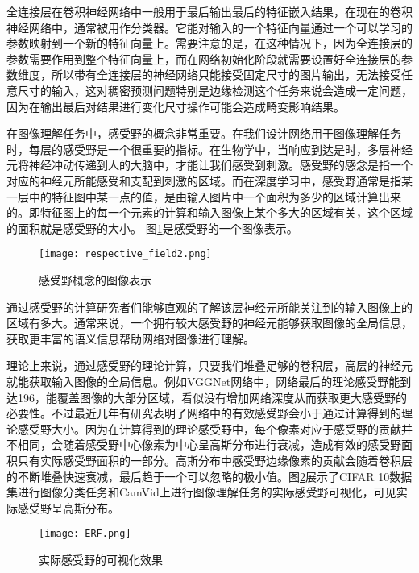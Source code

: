 \documentclass[master]{thesis-uestc}
\begin{document}
全连接层在卷积神经网络中一般用于最后输出最后的特征嵌入结果，在现在的卷积神经网络中，通常被用作分类器。它能对输入的一个特征向量通过一个可以学习的参数映射到一个新的特征向量上。需要注意的是，在这种情况下，因为全连接层的参数需要作用到整个特征向量上，而在网络初始化阶段就需要设置好全连接层的参数维度，所以带有全连接层的神经网络只能接受固定尺寸的图片输出，无法接受任意尺寸的输入，这对稠密预测问题特别是边缘检测这个任务来说会造成一定问题，因为在输出最后对结果进行变化尺寸操作可能会造成畸变影响结果。 

在图像理解任务中，感受野的概念非常重要。在我们设计网络用于图像理解任务时，每层的感受野是一个很重要的指标。在生物学中，当响应到达是时，多层神经元将神经冲动传递到人的大脑中，才能让我们感受到刺激。感受野的感念是指一个对应的神经元所能感受和支配到刺激的区域。而在深度学习中，感受野通常是指某一层中的特征图中某一点的值，是由输入图片中一个面积为多少的区域计算出来的。即特征图上的每一个元素的计算和输入图像上某个多大的区域有关，这个区域的面积就是感受野的大小。 图\ref{respective_field}是感受野的一个图像表示。


\begin{figure}[h]
    \texttt{[image: respective\_field2.png]}
    \caption{感受野概念的图像表示}
    \label{respective_field}
\end{figure}

通过感受野的计算研究者们能够直观的了解该层神经元所能关注到的输入图像上的区域有多大。通常来说，一个拥有较大感受野的神经元能够获取图像的全局信息，获取更丰富的语义信息帮助网络对图像进行理解。


理论上来说，通过感受野的理论计算，只要我们堆叠足够的卷积层，高层的神经元就能获取输入图像的全局信息。例如VGGNet网络中，网络最后的理论感受野能到达196，能覆盖图像的大部分区域，看似没有增加网络深度从而获取更大感受野的必要性。不过最近几年有研究表明了网络中的有效感受野会小于通过计算得到的理论感受野大小。因为在计算得到的理论感受野中，每个像素对应于感受野的贡献并不相同，会随着感受野中心像素为中心呈高斯分布进行衰减，造成有效的感受野面积只有实际感受野面积的一部分。高斯分布中感受野边缘像素的贡献会随着卷积层的不断堆叠快速衰减，最后趋于一个可以忽略的极小值。图\ref{erf}展示了CIFAR 10数据集进行图像分类任务和CamVid上进行图像理解任务的实际感受野可视化，可见实际感受野呈高斯分布。

\begin{figure}[h]
    \texttt{[image: ERF.png]}
    \caption{实际感受野的可视化效果}
    \label{erf}
\end{figure}
\end{document}
